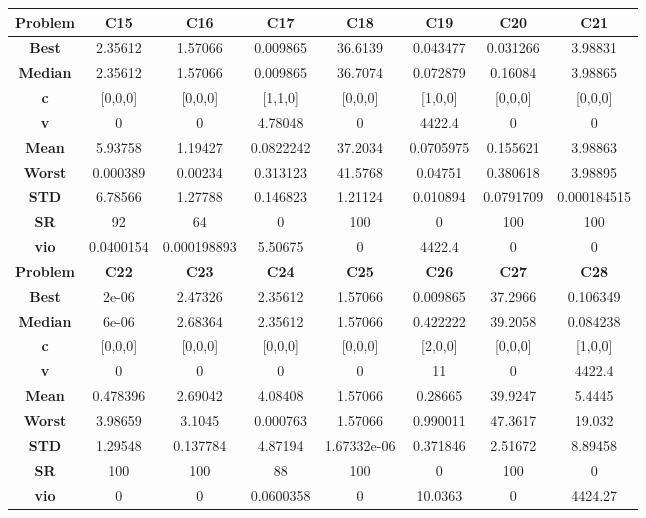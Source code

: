 \documentclass{IEEEtran}
\begin{document}
\begin{center}
\begin{tabular}{|c|c|c|c|c|c|c|c|}
    \hline 
    \hline 
    \textbf{Problem} & \textbf{C15} & \textbf{C16} & \textbf{C17} & \textbf{C18} & \textbf{C19} & \textbf{C20} & \textbf{C21} \\ 
    \hline\hline 
    \textbf{Best} & 2.35612 & 1.57066 & 0.009865 & 36.6139 & 0.043477 & 0.031266 & 3.98831\\ 
    \textbf{Median} & 2.35612 & 1.57066 & 0.009865 & 36.7074 & 0.072879 & 0.16084 & 3.98865\\ 
    \textbf{c} & [0,0,0] & [0,0,0] & [1,1,0] & [0,0,0] & [1,0,0] & [0,0,0] & [0,0,0]\\ 
    \textbf{v} & 0 & 0 & 4.78048 & 0 & 4422.4 & 0 & 0\\ 
    \textbf{Mean} & 5.93758 & 1.19427 & 0.0822242 & 37.2034 & 0.0705975 & 0.155621 & 3.98863\\ 
    \textbf{Worst} & 0.000389 & 0.00234 & 0.313123 & 41.5768 & 0.04751 & 0.380618 & 3.98895\\ 
    \textbf{STD} & 6.78566 & 1.27788 & 0.146823 & 1.21124 & 0.010894 & 0.0791709 & 0.000184515\\ 
    \textbf{SR} & 92 & 64 & 0 & 100 & 0 & 100 & 100\\ 
    \textbf{vio} & 0.0400154 & 0.000198893 & 5.50675 & 0 & 4422.4 & 0 & 0\\ 
    \hline 
    \hline 
    \textbf{Problem} & \textbf{C22} & \textbf{C23} & \textbf{C24} & \textbf{C25} & \textbf{C26} & \textbf{C27} & \textbf{C28} \\ 
    \hline\hline 
    \textbf{Best} & 2e-06 & 2.47326 & 2.35612 & 1.57066 & 0.009865 & 37.2966 & 0.106349\\ 
    \textbf{Median} & 6e-06 & 2.68364 & 2.35612 & 1.57066 & 0.422222 & 39.2058 & 0.084238\\ 
    \textbf{c} & [0,0,0] & [0,0,0] & [0,0,0] & [0,0,0] & [2,0,0] & [0,0,0] & [1,0,0]\\ 
    \textbf{v} & 0 & 0 & 0 & 0 & 11 & 0 & 4422.4\\ 
    \textbf{Mean} & 0.478396 & 2.69042 & 4.08408 & 1.57066 & 0.28665 & 39.9247 & 5.4445\\ 
    \textbf{Worst} & 3.98659 & 3.1045 & 0.000763 & 1.57066 & 0.990011 & 47.3617 & 19.032\\ 
    \textbf{STD} & 1.29548 & 0.137784 & 4.87194 & 1.67332e-06 & 0.371846 & 2.51672 & 8.89458\\ 
    \textbf{SR} & 100 & 100 & 88 & 100 & 0 & 100 & 0\\ 
    \textbf{vio} & 0 & 0 & 0.0600358 & 0 & 10.0363 & 0 & 4424.27\\ 
    \hline 
  \end{tabular}
\end{center}
\newpage
\end{document}
